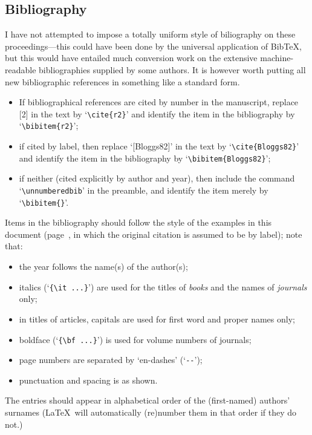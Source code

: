 \subsection{Bibliography}\label{ss52}
 
I have not attempted to impose a totally uniform style of biliography on
these proceedings---this could have been done by the universal application
of {\sc Bib\TeX}, but this would have entailed much conversion work on the
extensive machine-readable bibliographies supplied by some authors.  It is
however worth putting all new bibliographic references in something like a
standard form.
 
\begin{itemize}
 
\item If bibliographical references are cited by number in the manuscript,
replace [2] in the text by `\verb!\cite{r2}!' and identify the item in the
bibliography by `\verb!\bibitem{r2}!';
 
\item if cited by label, then replace `[Bloggs82]' in the text by
`\verb!\cite{Bloggs82}!' and identify the item in the bibliography by
`\verb!\bibitem{Bloggs82}!';
 
\item if neither (cited explicitly by author and year), then include the
command `\verb!\unnumberedbib!' in the preamble, and identify the item
merely by `\verb!\bibitem{}!'.
 
\end{itemize}
 
Items in the bibliography should follow the style of the examples in this
document (page~\pageref{bib}, in which the original citation is assumed to
be by label); note that:
\begin{itemize}
\item the year follows the name(s) of the author(s);
\item italics (`\verb!{\it ...}!') are used for the titles of {\em books}
and
the names of {\em journals} only;
\item in titles of articles, capitals are used for first word and proper
names only;
\item boldface (`\verb!{\bf ...}!') is used for volume numbers of journals;
\item page numbers are separated by `en-dashes' (`\verb!--!');
\item punctuation and spacing is as shown.
\end{itemize}
The entries should appear in alphabetical order of the (first-named)
authors' surnames (\LaTeX\ will automatically (re)number them in that
order if they do not.)
 
